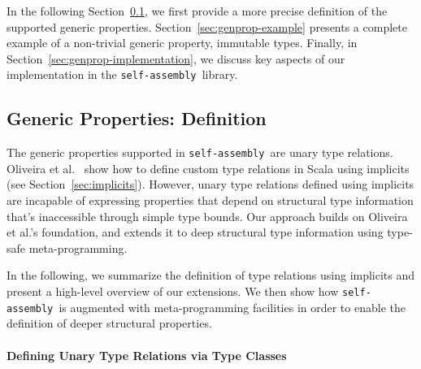 \documentclass[preprint,nocopyrightspace]{sigplanconf}
\newcommand{\selfassembly}{\texttt{self-assembly~}}
\begin{document}


In the following Section~\ref{sec:genprop-definition}, we first provide a more
precise definition of the supported generic properties.
Section~\ref{sec:genprop-example} presents a complete example of a non-trivial generic
property, immutable types. Finally, in Section~\ref{sec:genprop-implementation}, we discuss
key aspects of our implementation in the \selfassembly library.



\subsection{Generic Properties: Definition}
\label{sec:genprop-definition}

The generic properties supported in \selfassembly are unary type relations.
Oliveira et al.~\cite{Oliveira2010} show how to define custom type relations
in Scala using implicits (see Section~\ref{sec:implicits}). However, unary
type relations defined using implicits are incapable of expressing properties
that depend on structural type information that's inaccessible through simple
type bounds. Our approach builds on Oliveira et al.'s foundation, and extends
it to deep structural type information using type-safe meta-programming.

In the following, we summarize the definition of type relations using
implicits and present a high-level overview of our extensions. We then show
how \selfassembly is augmented with meta-programming facilities in order to
enable the definition of deeper structural properties.

\paragraph{Defining Unary Type Relations via Type Classes}
\end{document}
